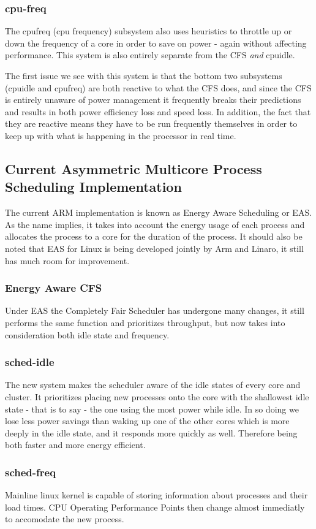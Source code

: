 \subsubsection{cpu-freq}
The cpufreq (cpu frequency) subsystem also uses heuristics to throttle up or down the frequency of a core in order to save on power - again without affecting performance. This system is also entirely separate from the CFS \textit{and} cpuidle.

The first issue we see with this system is that the bottom two subsystems (cpuidle and cpufreq) are both reactive to what the CFS does, and since the CFS is entirely unaware of power management it frequently breaks their predictions and results in both power efficiency loss and speed loss. In addition, the fact that they are reactive means they have to be run frequently themselves in order to keep up with what is happening in the processor in real time.

\subsection{Current Asymmetric Multicore Process Scheduling Implementation}
The current ARM implementation is known as Energy Aware Scheduling or EAS. As the name implies, it takes into account the energy usage of each process and allocates the process to a core for the duration of the process. It should also be noted that EAS for Linux is being developed jointly by Arm and Linaro, it still has much room for improvement.

\subsubsection{Energy Aware CFS}
Under EAS the Completely Fair Scheduler has undergone many changes, it still performs the same function and prioritizes throughput, but now takes into consideration both idle state and frequency. 

\subsubsection{sched-idle}
The new system makes the scheduler aware of the idle states of every core and cluster. It prioritizes placing new processes onto the core with the shallowest idle state - that is to say - the one using the most power while idle. In so doing we lose less power savings than waking up one of the other cores which is more deeply in the idle state, and it responds more quickly as well. Therefore being both faster and more energy efficient.

\subsubsection{sched-freq}
Mainline linux kernel is capable of storing information about processes and their load times. CPU Operating Performance Points then change almost immediatly to accomodate the new process.